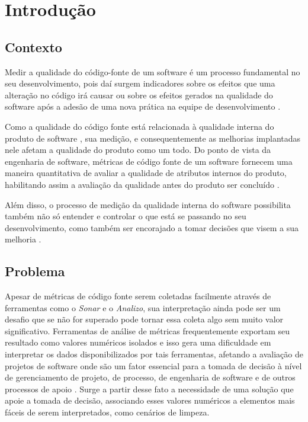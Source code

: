 \chapter{Introdução}

\section{Contexto}

Medir a qualidade do código-fonte  de um software é um processo fundamental no seu desenvolvimento, pois daí surgem indicadores sobre os efeitos que uma alteração no código irá causar ou sobre os efeitos gerados na qualidade do software após a adesão de uma nova prática na equipe de desenvolvimento \cite{Fenton98}. 

Como a qualidade do código fonte está relacionada à qualidade interna do produto de software \cite{ISO25023}, sua medição, e consequentemente as melhorias implantadas nele afetam a qualidade do produto como um todo. Do ponto de vista da engenharia de software, métricas de código fonte de um software fornecem uma maneira quantitativa de avaliar a qualidade de atributos internos do produto, habilitando assim a avaliação da qualidade antes do produto ser concluído \cite{pressman_engenharia_2010}.

Além disso, o processo de medição da qualidade interna do software possibilita também não só entender e controlar o que está se passando no seu desenvolvimento, como também ser encorajado a tomar decisões que visem a sua melhoria \cite{Fenton98}.
 
\section{Problema}
\label{intro_problema}

Apesar de métricas de código fonte serem coletadas facilmente através de ferramentas como o \textit{Sonar} e o \textit{Analizo}, sua interpretação ainda pode ser um desafio que se não for superado pode tornar essa coleta algo sem muito valor significativo. Ferramentas de análise de métricas frequentemente exportam seu resultado como valores numéricos isolados \cite{Meirelles2013} e isso gera uma dificuldade em interpretar os dados disponibilizados por tais ferramentas, afetando a avaliação de projetos de software onde são um fator essencial para a tomada de decisão à nível de gerenciamento de projeto, de processo, de engenharia de software e de outros processos de apoio \cite{pandian_software_2004}. Surge a partir desse fato a necessidade de uma solução que apoie a tomada de decisão, associando esses valores numéricos a elementos mais fáceis de serem interpretados, como cenários de limpeza. 

